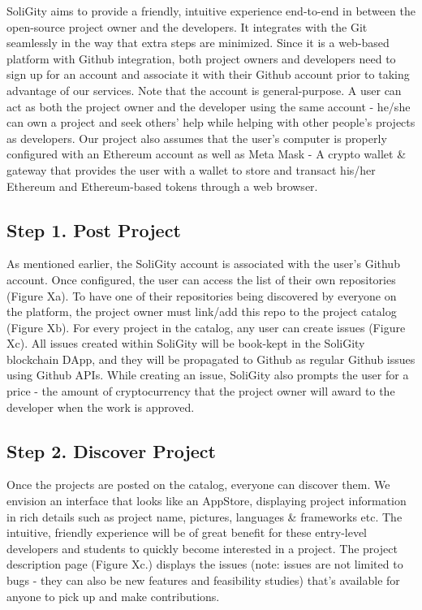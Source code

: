 \documentclass[12pt]{article}
\renewcommand{\_}{\kern-1.5pt\textunderscore\kern-1.5pt}
\begin{document}
SoliGity aims to provide a friendly, intuitive experience end-to-end in between the open-source project owner
and the developers. It integrates with the Git seamlessly in the way that extra steps are minimized. Since it
is a web-based platform with Github integration, both project owners and developers need to sign up for an account
and associate it with their Github account prior to taking advantage of our services. Note that the account is
general-purpose. A user can act as both the project owner and the developer using the same account - he/she can
own a project and seek others’ help while helping with other people’s projects as developers. Our project also
assumes that the user’s computer is properly configured with an Ethereum account as well as Meta Mask - A crypto
wallet \& gateway that provides the user with a wallet to store and transact his/her Ethereum and Ethereum-based
tokens through a web browser.

\subsection*{Step 1. Post Project}

As mentioned earlier, the SoliGity account is associated with the user’s Github account. Once configured, the user
can access the list of their own repositories (Figure Xa). To have one of their repositories being discovered by
everyone on the platform, the project owner must link/add this repo to the project catalog (Figure Xb). For every
project in the catalog, any user can create issues (Figure Xc). All issues created within SoliGity will be book-kept
in the SoliGity blockchain DApp, and they will be propagated to Github as regular Github issues using Github APIs.
While creating an issue, SoliGity also prompts the user for a price - the amount of cryptocurrency that the project
owner will award to the developer when the work is approved.


\subsection*{Step 2. Discover Project}

Once the projects are posted on the catalog, everyone can discover them. We envision an interface that looks like an
AppStore, displaying project information in rich details such as project name, pictures, languages \& frameworks etc.
The intuitive, friendly experience will be of great benefit for these entry-level developers and students to quickly
become interested in a project. The project description page (Figure Xc.) displays the issues (note: issues are not
limited to bugs - they can also be new features and feasibility studies) that’s available for anyone to pick up and
make contributions.
\end{document}
